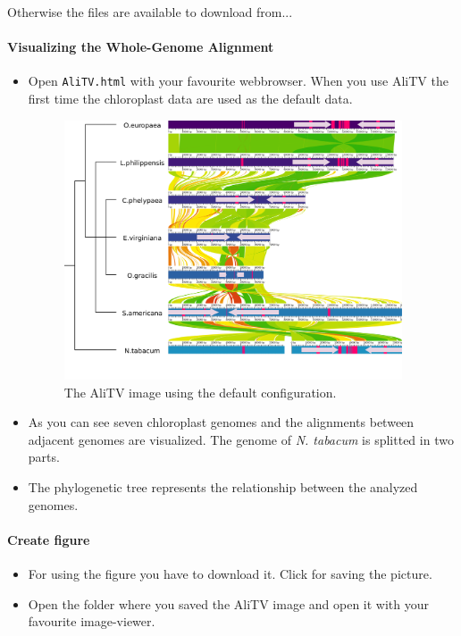 \documentclass[a4paper]{scrartcl}
\begin{document}
Otherwise the files are available to download from...
\paragraph*{Visualizing the Whole-Genome Alignment}
\begin{itemize}
	\item Open \texttt{AliTV.html} with your favourite webbrowser. When you use AliTV the first time the chloroplast data are used as the default data. 
		
	\begin{figure}[H]
		\centering
		\includegraphics[width=10cm]{showLabels.png}
		\caption{The AliTV image using the default configuration.}
	\end{figure}
	
	\item As you can see seven chloroplast genomes and the alignments between adjacent genomes are visualized. The genome of \textit{N. tabacum} is splitted in two parts. 
	\item The phylogenetic tree represents the relationship between the analyzed genomes.
\end{itemize}

\paragraph*{Create figure}
\begin{itemize}
	\item For using the figure you have to download it. Click  for saving the picture.
	\item Open the folder where you saved the AliTV image and open it with your favourite image-viewer.
\end{itemize}
\end{document}
